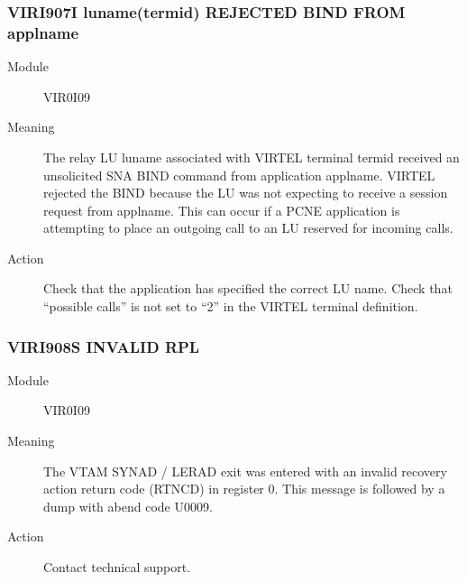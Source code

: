 \documentclass[letterpaper,10pt,english]{sphinxmanual}
\begin{document}
\subsubsection{VIRI907I luname(termid) REJECTED BIND FROM applname}
\label{\detokenize{messages:viri907i-luname-termid-rejected-bind-from-applname}}\begin{description}
\item[{Module}] \leavevmode
VIR0I09

\item[{Meaning}] \leavevmode
The relay LU luname associated with VIRTEL terminal termid received an unsolicited SNA BIND command from application applname. VIRTEL rejected the BIND because the LU was not expecting to receive a session request from applname. This can occur if a PCNE application is attempting to place an outgoing call to an LU reserved for incoming calls.

\item[{Action}] \leavevmode
Check that the application has specified the correct LU name. Check that “possible calls” is not set to “2” in the VIRTEL terminal definition.

\end{description}


\subsubsection{VIRI908S INVALID RPL}
\label{\detokenize{messages:viri908s-invalid-rpl}}\begin{description}
\item[{Module}] \leavevmode
VIR0I09

\item[{Meaning}] \leavevmode
The VTAM SYNAD / LERAD exit was entered with an invalid recovery action return code (RTNCD) in register 0. This message is followed by a dump with abend code U0009.

\item[{Action}] \leavevmode
Contact technical support.

\end{description}
\end{document}
